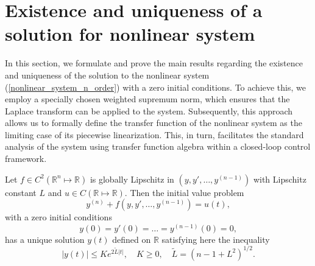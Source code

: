\documentclass[preprint,12pt]{elsarticle}
\begin{document}
\section[]{Existence and uniqueness of a solution for nonlinear system}
In this section, we formulate and prove the main results regarding the existence and uniqueness of the solution to the nonlinear system (\ref{nonlinear_system_n_order}) with a zero initial conditions. To achieve this, we employ a specially chosen weighted supremum norm, which ensures that the Laplace transform can be applied to the system. Subsequently, this approach allows us to formally define the transfer function of the nonlinear system as the limiting case of its piecewise linearization. This, in turn, facilitates the standard analysis of the system using transfer function algebra within a closed-loop control framework.
\begin{thm} Let $f\in C^2(\mathbb{R}^n\mapsto \mathbb{R})$ is globally Lipschitz in \((y, y', \dots, y^{(n-1)})\) with Lipschitz constant $L$ and $u\in C(\mathbb{R}\mapsto \mathbb{R})$. Then the initial value problem
\[
y^{(n)} + f(y, y', \dots, y^{(n-1)}) = u(t),
\]
with a zero initial conditions
\[
y(0) = y'(0) = \dots = y^{(n-1)}(0) = 0,
\]
has a unique solution $y(t)$ defined on $\mathbb{R}$ satisfying here the inequality
\[
|y(t)|\leq Ke^{2\tilde L|t|},\quad  K\geq0,\quad \tilde L=({n-1+L^2})^{1/2}.
\]
\end{thm}
\end{document}
